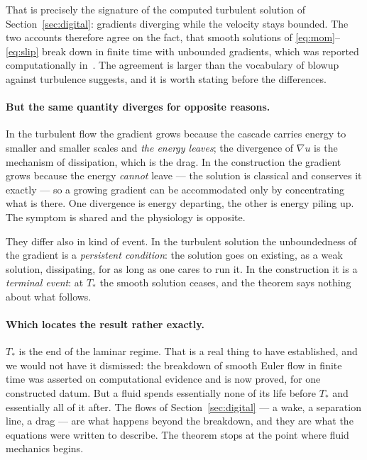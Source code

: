\documentclass[11pt]{article}
\newcommand{\grad}{\nabla}
\begin{document}
That is precisely the signature of the computed turbulent solution of
Section~\ref{sec:digital}: gradients diverging while the velocity stays bounded. The two accounts
therefore agree on the fact, that smooth solutions of \eqref{eq:mom}--\eqref{eq:slip} break down in
finite time with unbounded gradients, which was reported computationally
in~\cite{blowupHJ}. The agreement is larger than the vocabulary of blowup against turbulence
suggests, and it is worth stating before the differences.

\paragraph{But the same quantity diverges for opposite reasons.} In the turbulent flow the gradient
grows because the cascade carries energy to smaller and smaller scales and \emph{the energy leaves};
the divergence of $\grad u$ is the mechanism of dissipation, which is the drag. In the construction
the gradient grows because the energy \emph{cannot} leave --- the solution is classical and conserves
it exactly --- so a growing gradient can be accommodated only by concentrating what is there. One
divergence is energy departing, the other is energy piling up. The symptom is shared and the
physiology is opposite.

They differ also in kind of event. In the turbulent solution the unboundedness of the gradient is a
\emph{persistent condition}: the solution goes on existing, as a weak solution, dissipating, for as
long as one cares to run it. In the construction it is a \emph{terminal event}: at $T_*$ the smooth
solution ceases, and the theorem says nothing about what follows.

\paragraph{Which locates the result rather exactly.} $T_*$ is the end of the laminar regime. That is
a real thing to have established, and we would not have it dismissed: the breakdown of smooth Euler
flow in finite time was asserted on computational evidence and is now proved, for one constructed
datum. But a fluid spends essentially none of its life before $T_*$ and essentially all of it
after. The flows of Section~\ref{sec:digital} --- a wake, a separation line, a drag --- are what
happens beyond the breakdown, and they are what the equations were written to describe. The theorem
stops at the point where fluid mechanics begins.
\end{document}

